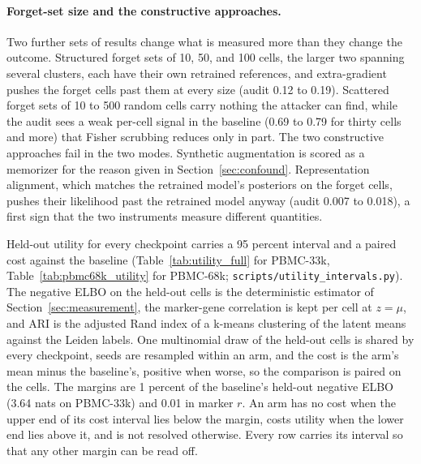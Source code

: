 \documentclass{article}
\begin{document}
\begin{table}[h]
\centering
\caption{Settings of every method and of the attacker. Generated by \texttt{scripts/make\_tex\_tables.py} from the driver scripts' values.}
\label{tab:hparams}
\small
\resizebox{\textwidth}{!}{}
\end{table}


\paragraph{Forget-set size and the constructive approaches.} Two further sets of results change what is measured more than they change the outcome. Structured forget sets of 10, 50, and 100 cells, the larger two spanning several clusters, each have their own retrained references, and extra-gradient pushes the forget cells past them at every size (audit 0.12 to 0.19). Scattered forget sets of 10 to 500 random cells carry nothing the attacker can find, while the audit sees a weak per-cell signal in the baseline (0.69 to 0.79 for thirty cells and more) that Fisher scrubbing reduces only in part. The two constructive approaches fail in the two modes. Synthetic augmentation is scored as a memorizer for the reason given in Section~\ref{sec:confound}. Representation alignment, which matches the retrained model's posteriors on the forget cells, pushes their likelihood past the retrained model anyway (audit 0.007 to 0.018), a first sign that the two instruments measure different quantities.

Held-out utility for every checkpoint carries a 95 percent interval and a paired cost against the baseline (Table~\ref{tab:utility_full} for PBMC-33k, Table~\ref{tab:pbmc68k_utility} for PBMC-68k; \texttt{scripts/utility\_intervals.py}). The negative ELBO on the held-out cells is the deterministic estimator of Section~\ref{sec:measurement}, the marker-gene correlation is kept per cell at $z=\mu$, and ARI is the adjusted Rand index of a k-means clustering of the latent means against the Leiden labels. One multinomial draw of the held-out cells is shared by every checkpoint, seeds are resampled within an arm, and the cost is the arm's mean minus the baseline's, positive when worse, so the comparison is paired on the cells. The margins are 1 percent of the baseline's held-out negative ELBO (3.64 nats on PBMC-33k) and 0.01 in marker $r$. An arm has no cost when the upper end of its cost interval lies below the margin, costs utility when the lower end lies above it, and is not resolved otherwise. Every row carries its interval so that any other margin can be read off.
\end{document}
